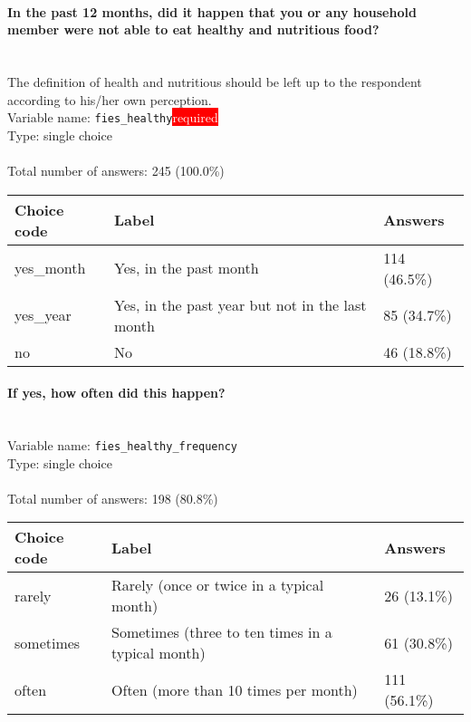 \documentclass[11.5pt, a4paper]{scrartcl}
\begin{document}
\paragraph{In the past 12 months, did it happen that you or any household member were not able to eat healthy and nutritious food? }
\ \\ {\small The definition of health and nutritious should be left up to the respondent according to his/her own perception.}
\  \\Variable name: \texttt{fies\_healthy}\hfill\colorbox{red}{\small{\textcolor{white}{required}}}\\
 Type: single choice\\
\\Total number of answers: 245 (100.0\%)
\\[0.2em] \begin{tabular}{p{4cm}|p{8cm}|p{3cm}}
Choice code & Label & Answers \\
\hline
yes\_month & Yes, in the past month& \cellcolor{color2}114 (46.5\%)\\
\cellcolor{mygray} yes\_year & \cellcolor{mygray}Yes, in the past year but not in the last month & \cellcolor{color1}85 (34.7\%)\\
no & No& \cellcolor{color0}46 (18.8\%)\\
\end{tabular}
\paragraph{If yes, how often did this happen? }
\  \\Variable name: \texttt{fies\_healthy\_frequency}\\
Type: single choice\\
\\Total number of answers: 198 (80.8\%)
\\[0.2em] \begin{tabular}{p{4cm}|p{8cm}|p{3cm}}
Choice code & Label & Answers \\
\hline
rarely & Rarely (once or twice in a typical month)& \cellcolor{color0}26 (13.1\%)\\
\cellcolor{mygray} sometimes & \cellcolor{mygray}Sometimes (three to ten times in a typical month) & \cellcolor{color1}61 (30.8\%)\\
often & Often (more than 10 times per month)& \cellcolor{color2}111 (56.1\%)\\
\end{tabular}
\end{document}
